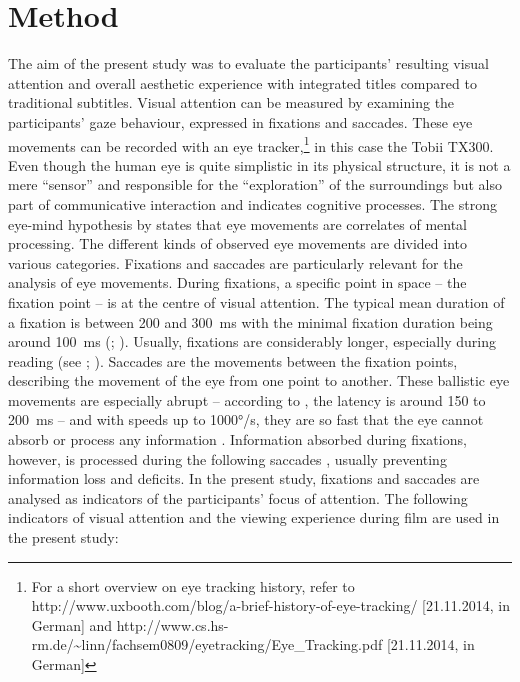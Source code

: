 \documentclass[output=paper]{langsci/langscibook}
\begin{document}
\section{Method}

The aim of the present study was to evaluate the participants' resulting visual attention and overall aesthetic experience with integrated titles compared to traditional subtitles. Visual attention can be measured by examining the participants' gaze behaviour, expressed in fixations and saccades. These eye movements can be recorded with an eye tracker,\footnote{For a short overview on eye tracking history, refer to http://www.uxbooth.com/blog/a-brief-history-of-eye-tracking/ [21.11.2014, in German] and http://www.cs.hs-rm.de/\~{}linn/fachsem0809/eyetracking/Eye\_Tracking.pdf [21.11.2014, in German]} in this case the Tobii TX300. Even though the human eye is quite simplistic in its physical structure, it is not a mere ``sensor'' \citep[1]{Joos2002} and responsible for the ``exploration'' of the surroundings but also part of communicative interaction and indicates cognitive processes. The strong eye-mind hypothesis by \citet{justcarpenter1980} states that eye movements are correlates of mental processing. The different kinds of observed eye movements are divided into various categories. Fixations and saccades are particularly relevant for the analysis of eye movements. During fixations, a specific point in space – the fixation point – is at the centre of visual attention. The typical mean duration of a fixation is between 200 and 300~ms with the minimal fixation duration being around 100~ms (\citealt[373]{rayner1998}; \citealt[2]{flothow2009}). Usually, fixations are considerably longer, especially during reading (see \citealt{rayner1998}; \citealt{jakobsen2008}). Saccades are the movements between the fixation points, describing the movement of the eye from one point to another. These ballistic eye movements are especially abrupt – according to \citet[17]{joos2005}, the latency is around 150 to 200~ms – and with speeds up to 1000°/s, they are so fast that the eye cannot absorb or process any information \citep[4]{flothow2009}. Information absorbed during fixations, however, is processed during the following saccades \citep[6]{kowler2006}, usually preventing information loss and deficits. In the present study, fixations and saccades are analysed as indicators of the participants' focus of attention. The following indicators of visual attention and the viewing experience during film are used in the present study:
\end{document}
